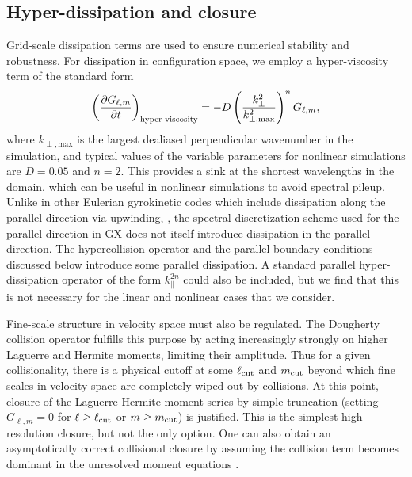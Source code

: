 \documentclass{jpp}
\newcommand{\GX}{{GX}\xspace}
\begin{document}

\subsection{Hyper-dissipation and closure} \label{sec:hyper}

Grid-scale dissipation terms are used to ensure numerical stability and robustness. For dissipation in configuration space, we employ a hyper-viscosity term of the standard form
\begin{equation}
\left(\frac{\partial G_{\ell,m}}{\partial t}\right)_\textrm{hyper-viscosity} = - D \left(\frac{k_\perp^2}{k_{\perp,\mathrm{max}}^2}\right)^n G_{\ell,m},
\end{equation}
where {\color{black} $k_{\perp,\mathrm{max}}$ is the largest dealiased perpendicular wavenumber in the simulation, and} typical values of the variable parameters for nonlinear simulations are $D=0.05$ and $n=2$. This provides a sink at the shortest wavelengths in the domain, which can be useful in nonlinear simulations to avoid spectral pileup. {\color{black} Unlike in other Eulerian gyrokinetic codes which include dissipation along the parallel direction via upwinding, \citep{kotschenreuther1995,jenko2001,Candy2016,Barnes2019}, the spectral discretization scheme used for the parallel direction in \GX does not itself introduce dissipation in the parallel direction. The hypercollision operator and the parallel boundary conditions discussed below introduce some parallel dissipation. A standard parallel hyper-dissipation operator of the form $k_\parallel^{2n}$ could also be included, but we find that this is not necessary for the linear and nonlinear cases that we consider.} 

Fine-scale structure in velocity space must also be regulated. 
The Dougherty collision operator fulfills this purpose by acting increasingly strongly
on higher Laguerre and Hermite moments, limiting their amplitude. Thus for a given
collisionality, there is a physical cutoff at some ${\color{black} \ell_\mathrm{cut}}$ and ${\color{black}m_\mathrm{cut}}$ beyond which fine scales
in velocity space are completely wiped out by collisions. At this point, closure of the Laguerre-Hermite moment series by simple truncation (setting $G_{\ell,m}=0$ for $\ell\geq{\color{black} \ell_\mathrm{cut}}$ or $m\geq{\color{black} m_\mathrm{cut}}$) is justified. This is the simplest high-resolution closure, but not the only
option. One can also obtain an asymptotically correct collisional closure by assuming
the collision term becomes dominant in the unresolved moment equations {\color{black} \citep{Zocco2015,Loureiro2016,Jorge2017,Frei2022}}.
\end{document}
